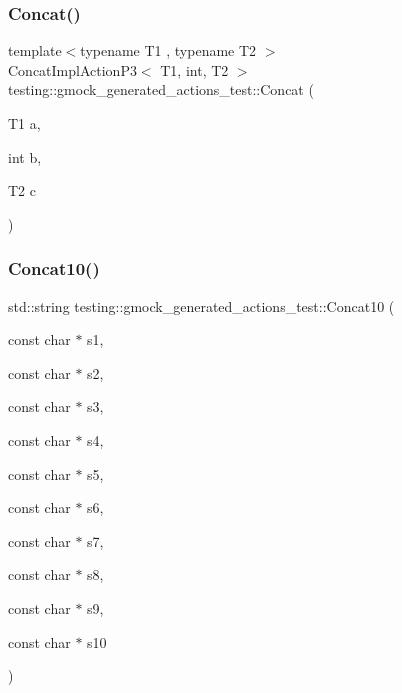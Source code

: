 \mbox{\label{namespacetesting_1_1gmock__generated__actions__test_ab7e41148b644bc80a67a90d584691978}} 
\subsubsection{\texorpdfstring{Concat()}{Concat()}\hspace{0.1cm}{\footnotesize\ttfamily [2/2]}}
{\footnotesize\ttfamily template$<$typename T1 , typename T2 $>$ \\
Concat\+Impl\+Action\+P3$<$ T1, int, T2 $>$ testing\+::gmock\+\_\+generated\+\_\+actions\+\_\+test\+::\+Concat (\begin{DoxyParamCaption}\item[{T1}]{a,  }\item[{int}]{b,  }\item[{T2}]{c }\end{DoxyParamCaption})}

\mbox{\label{namespacetesting_1_1gmock__generated__actions__test_aa3e21c9555fb8d1eafd7186d1e9b2db3}} 
\subsubsection{\texorpdfstring{Concat10()}{Concat10()}}
{\footnotesize\ttfamily std\+::string testing\+::gmock\+\_\+generated\+\_\+actions\+\_\+test\+::\+Concat10 (\begin{DoxyParamCaption}\item[{const char $\ast$}]{s1,  }\item[{const char $\ast$}]{s2,  }\item[{const char $\ast$}]{s3,  }\item[{const char $\ast$}]{s4,  }\item[{const char $\ast$}]{s5,  }\item[{const char $\ast$}]{s6,  }\item[{const char $\ast$}]{s7,  }\item[{const char $\ast$}]{s8,  }\item[{const char $\ast$}]{s9,  }\item[{const char $\ast$}]{s10 }\end{DoxyParamCaption})}


